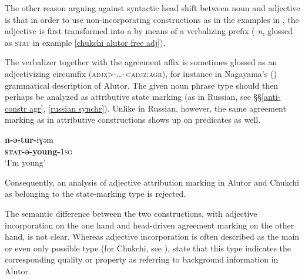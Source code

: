 The other reason arguing against syntactic head shift between noun and adjective is that in order to use non-incorporating constructions as in the examples in , the adjective is first transformed into a  by means of a verbalizing prefix (\textit{-n}, glossed as \textsc{stat} in example \ref{chukchi alutor free adj}).

The verbalizer together with the agreement affix is sometimes glossed as an adjectivizing circumfix (\textsc{adjz>-\dots-<adjz:agr}), for instance in Nagayama's (\citeyear{nagayama2003}) grammatical description of Alutor. The given noun phrase type should then perhaps be analyzed as attributive state marking (as in Russian, see \S\S\ref{anti-constr agr}, \ref{russian synchr}). Unlike in Russian, however, the same agreement marking as in attributive constructions shows up on predicates as well.
\begin{exe}
\begin{xlist}
\ex
\gll	\textbf{n-ə-tur-}iɣəm\\
	\textbf{\textsc{stat}-ə-young-}\textsc{1sg}\\
\glt	‘I'm young’
\end{xlist}
\end{exe}
Consequently, an analysis of adjective attribution marking in Alutor and Chukchi as belonging to the state-marking type is rejected.

The semantic difference between the two constructions, with adjective incorporation on the one hand and head\hyp{}driven agreement marking on the other hand, is not clear. Whereas adjective incorporation is often described as the main or even only possible type (for Chukchi, see \citealt[37, 101]{kampfe-etal1995}), \citet[288]{kibrik-etal2000} state that this type indicates the corresponding quality or property as referring to background information in Alutor.

